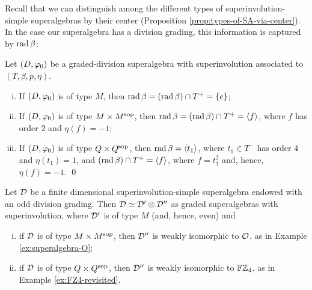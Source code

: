 
Recall that we can distinguish among the different types of superinvolution-simple superalgebras by their center (Proposition \ref{prop:types-of-SA-via-center}).
In the case our superalgebra has a division grading, this information is captured by $\operatorname{rad} \beta$:

\begin{lemma}\label{lemma:types-of-D-via-rad-beta}
	Let $(D, \varphi_0)$ be a graded-division superalgebra with superinvolution associated to $(T, \beta, p, \eta)$.
	\begin{enumerate}[(i)]
		\item If $(D, \varphi_0)$ is of type $M$, then $\operatorname{rad} \beta = (\operatorname{rad} \beta) \cap T^+ = \{e\}$;
		\item If $(D, \varphi_0)$ is of type $M\times M^{\mathrm{sop}}$, then $\operatorname{rad} \beta = (\operatorname{rad} \beta) \cap T^+ = \langle f \rangle$, where $f$ has order $2$ and $\eta(f) = -1$;
		\item If $(D, \varphi_0)$ is of type $Q\times Q^{\mathrm{sop}}$, then $\operatorname{rad} \beta = \langle t_1 \rangle$, where $t_1 \in T^-$ has order $4$ and $\eta(t_1) = 1$, and $(\operatorname{rad} \beta) \cap T^+ = \langle f \rangle$, where $f = t_1^2$ and, hence, $\eta(f) = -1$. \qed
	\end{enumerate}
\end{lemma}

\begin{thm}
	Let $\mathcal{D}$ be a finite dimensional superinvolution-simple superalgebra endowed with an odd division grading.
	Then $\mathcal{D} \simeq \mathcal{D}' \otimes \mathcal{D}''$ as graded superalgebras with superinvolution, where $\mathcal{D}'$ is of type $M$ (and, hence, even) and
	\begin{enumerate}[(i)]
		\item if $\mathcal{D}$ is of type $M\times M^{\mathrm{sop}}$, then $\mathcal{D}''$ is weakly isomorphic to $\mathcal O$, as in Example \ref{ex:superalgebra-O};
		\item if $\mathcal{D}$ is of type $Q\times Q^{\mathrm{sop}}$, then $\mathcal{D}''$ is weakly isomorphic to $\mathbb{F}\mathbb{Z}_4$, as in Example \ref{ex:FZ4-revisited}.
	\end{enumerate}
\end{thm}

